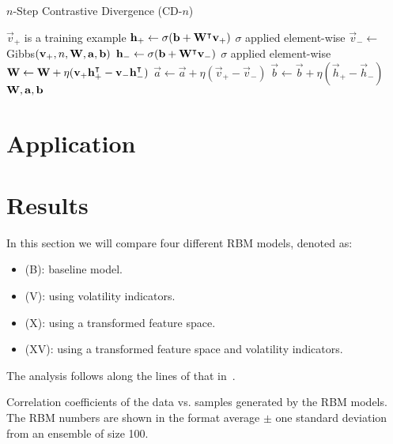 \begin{algorithm}
    \caption{$n$-Step Contrastive Divergence (CD-$n$)}
\begin{algorithmic}[1]
        \Comment $\vec{v}_+$ is a training example
        \State $\mathbf{h}_+ \gets \sigma(\mathbf{b} + \mathbf{W}^\intercal\mathbf{v}_+)$
            \Comment $\sigma$ applied element-wise
        \State $\vec{v}_- \gets$ Gibbs$(\mathbf{v}_+,n,\mathbf{W},\mathbf{a},\mathbf{b})$
        \State $\mathbf{h}_- \gets \sigma(\mathbf{b} + \mathbf{W}^\intercal\mathbf{v}_-)$
            \Comment $\sigma$ applied element-wise
        \State $\mathbf{W} \gets \mathbf{W} + \eta(\mathbf{v}_+ \mathbf{h}_+^\intercal - \mathbf{v}_- \mathbf{h}_-^\intercal)$
        \State $\vec{a} \gets \vec{a} + \eta(\vec{v}_+ - \vec{v}_-)$
        \State $\vec{b} \gets \vec{b} + \eta(\vec{h}_+ - \vec{h}_-)$
        \State \Return $\mathbf{W}, \mathbf{a}, \mathbf{b}$
    \EndProcedure
\end{algorithmic}
\label{alg:CDn}
\end{algorithm}


\section{Application}

\section{Results}
In this section we will compare four different RBM models, denoted as:
\begin{itemize}
    \item (B): baseline model.
    \item (V): using volatility indicators.
    \item (X): using a transformed feature space.
    \item (XV): using a transformed feature space and volatility indicators.
\end{itemize}
The analysis follows along the lines of that in~\cite{kondratyev_2019}.

\begin{table}[!htb]
    \centering
    \begin{adjustbox}{max width=\textwidth}
        
    \end{adjustbox}
    \caption{Correlation coefficients of the data vs. samples generated by the RBM models. The RBM numbers are shown in the format average \(\pm\) one standard deviation from an ensemble of size 100.}
    \label{tbl:rbm_correlation_coefficients}
\end{table}

